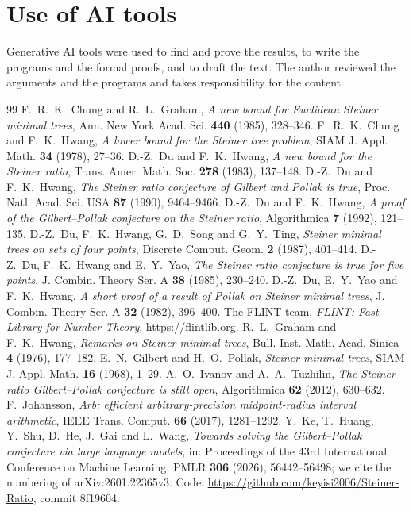 \documentclass[11pt]{amsart}
\theoremstyle{definition}
\theoremstyle{remark}
\numberwithin{equation}{section}
\begin{document}
\section*{Use of AI tools}
Generative AI tools were used to find and prove the results, to write the programs and the formal proofs, and to draft the text. The author reviewed the arguments and the programs and takes responsibility for the content.

\begin{thebibliography}{99}
 F.~R.~K.~Chung and R.~L.~Graham, \emph{A new bound for Euclidean Steiner minimal trees}, Ann. New York Acad. Sci. \textbf{440} (1985), 328--346.
 F.~R.~K.~Chung and F.~K.~Hwang, \emph{A lower bound for the Steiner tree problem}, SIAM J. Appl. Math. \textbf{34} (1978), 27--36.
 D.-Z.~Du and F.~K.~Hwang, \emph{A new bound for the Steiner ratio}, Trans. Amer. Math. Soc. \textbf{278} (1983), 137--148.
 D.-Z.~Du and F.~K.~Hwang, \emph{The Steiner ratio conjecture of Gilbert and Pollak is true}, Proc. Natl. Acad. Sci. USA \textbf{87} (1990), 9464--9466.
 D.-Z.~Du and F.~K.~Hwang, \emph{A proof of the Gilbert--Pollak conjecture on the Steiner ratio}, Algorithmica \textbf{7} (1992), 121--135.
 D.-Z.~Du, F.~K.~Hwang, G.~D.~Song and G.~Y.~Ting, \emph{Steiner minimal trees on sets of four points}, Discrete Comput. Geom. \textbf{2} (1987), 401--414.
 D.-Z.~Du, F.~K.~Hwang and E.~Y.~Yao, \emph{The Steiner ratio conjecture is true for five points}, J. Combin. Theory Ser. A \textbf{38} (1985), 230--240.
 D.-Z.~Du, E.~Y.~Yao and F.~K.~Hwang, \emph{A short proof of a result of Pollak on Steiner minimal trees}, J. Combin. Theory Ser. A \textbf{32} (1982), 396--400.
 The FLINT team, \emph{FLINT: Fast Library for Number Theory}, \url{https://flintlib.org}.
 R.~L.~Graham and F.~K.~Hwang, \emph{Remarks on Steiner minimal trees}, Bull. Inst. Math. Acad. Sinica \textbf{4} (1976), 177--182.
 E.~N.~Gilbert and H.~O.~Pollak, \emph{Steiner minimal trees}, SIAM J. Appl. Math. \textbf{16} (1968), 1--29.
 A.~O.~Ivanov and A.~A.~Tuzhilin, \emph{The Steiner ratio Gilbert--Pollak conjecture is still open}, Algorithmica \textbf{62} (2012), 630--632.
 F.~Johansson, \emph{Arb: efficient arbitrary-precision midpoint-radius interval arithmetic}, IEEE Trans. Comput. \textbf{66} (2017), 1281--1292.
 Y.~Ke, T.~Huang, Y.~Shu, D.~He, J.~Gai and L.~Wang, \emph{Towards solving the Gilbert--Pollak conjecture via large language models}, in: Proceedings of the 43rd International Conference on Machine Learning, PMLR \textbf{306} (2026), 56442--56498; we cite the numbering of arXiv:2601.22365v3. Code: \url{https://github.com/keyisi2006/Steiner-Ratio}, commit 8f19604.

\end{thebibliography}
\end{document}
